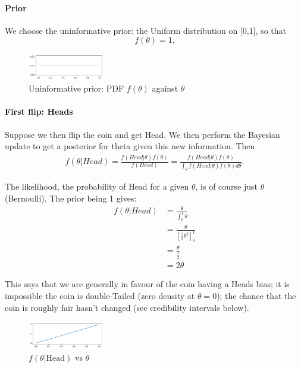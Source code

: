 \documentclass{article}
\begin{document}
\paragraph{Prior}
We choose the uninformative prior: the Uniform distribution on [0,1], so that 
\begin{equation}
    f(\theta)=1.
\end{equation}

\begin{figure}[h]
\centering
\includegraphics[width=0.3\textwidth]{1_unif.png}
\caption{\label{fig:frog}Uninformative prior: PDF $f(\theta)$ against $\theta$}
\end{figure}

\paragraph{First flip: Heads}

Suppose we then flip the coin and get Head. We then perform the Bayesian update to get a posterior for theta given this new information. Then 
\begin{align}
f(\theta|{Head}) = \frac{f({Head}|\theta)f(\theta)}{f({Head})}
= \frac{f({Head}|\theta)f(\theta)}{\int_{\theta} f({Head}|\theta)f(\theta) d\theta}.
\end{align}

The likelihood, the probability of Head for a given $\theta$, is of course just $\theta$ (Bernoulli). The prior being 1 gives:
\begin{equation}
\begin{split}
f(\theta|{Head})
&= \frac{\theta}{\int_0^1 \theta} \\
&=\frac{\theta}{[\frac{1}{2}\theta^2]_0^1} \\
&=\frac{\theta}{\frac{1}{2}} \\
&= 2\theta
\end{split}
\end{equation}

This says that we are generally in favour of the coin having a Heads bias; it is impossible the coin is double-Tailed (zero density at $\theta=0$); the chance that the coin is roughly fair hasn't changed (see credibility intervals below).

\begin{figure}[h]
\centering
\includegraphics[width=0.3\textwidth]{2_H.png}
\caption{\label{fig:H} $f(\theta|\text{Head})$ vs $\theta$}
\end{figure}
\end{document}
